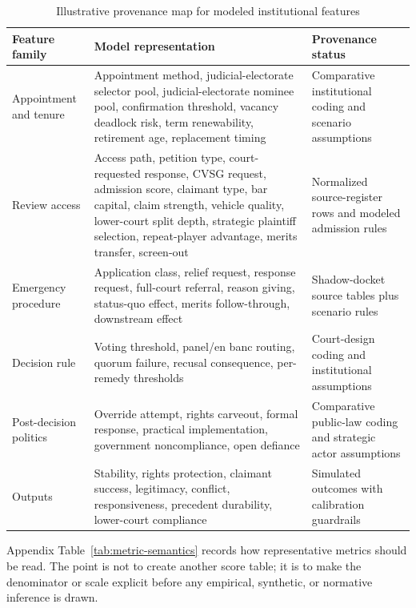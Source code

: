 \documentclass[
    journal=jlc,
    manuscript=research-article,
    year=2026,
  ]{cup-journal}
\providecommand{\Description}[1]{}
\begin{document}
\begin{table}[hbt!]
\centering
\caption{Illustrative provenance map for modeled institutional features}
\label{tab:provenance}
\Description{Table mapping modeled institutional feature families to simulator representations and provenance status.}
\small
\begin{tabular}{>{\raggedright\arraybackslash}p{1.45in}>{\raggedright\arraybackslash}p{1.75in}>{\raggedright\arraybackslash}p{1.65in}}
\toprule
Feature family & Model representation & Provenance status \\
\midrule
Appointment and tenure & Appointment method, judicial-electorate selector pool, judicial-electorate nominee pool, confirmation threshold, vacancy deadlock risk, term renewability, retirement age, replacement timing & Comparative institutional coding and scenario assumptions \\
Review access & Access path, petition type, court-requested response, CVSG request, admission score, claimant type, bar capital, claim strength, vehicle quality, lower-court split depth, strategic plaintiff selection, repeat-player advantage, merits transfer, screen-out & Normalized source-register rows and modeled admission rules \\
Emergency procedure & Application class, relief request, response request, full-court referral, reason giving, status-quo effect, merits follow-through, downstream effect & Shadow-docket source tables plus scenario rules \\
Decision rule & Voting threshold, panel/en banc routing, quorum failure, recusal consequence, per-remedy thresholds & Court-design coding and institutional assumptions \\
Post-decision politics & Override attempt, rights carveout, formal response, practical implementation, government noncompliance, open defiance & Comparative public-law coding and strategic actor assumptions \\
Outputs & Stability, rights protection, claimant success, legitimacy, conflict, responsiveness, precedent durability, lower-court compliance & Simulated outcomes with calibration guardrails \\
\bottomrule
\end{tabular}
\end{table}

Appendix Table~\ref{tab:metric-semantics} records how representative metrics should be read. The point is not to create another score table; it is to make the denominator or scale explicit before any empirical, synthetic, or normative inference is drawn.
\end{document}
